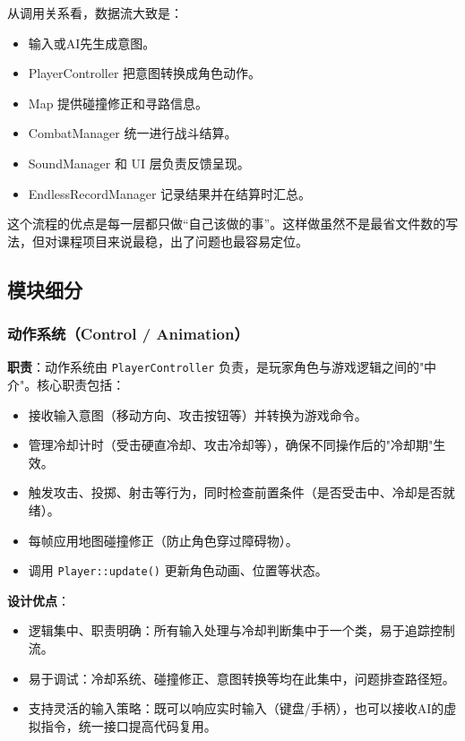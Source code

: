 ﻿\documentclass[utf8]{ctexart}
\begin{document}
从调用关系看，数据流大致是：

\begin{itemize}
  \item 输入或AI先生成意图。
  \item PlayerController 把意图转换成角色动作。
  \item Map 提供碰撞修正和寻路信息。
  \item CombatManager 统一进行战斗结算。
  \item SoundManager 和 UI 层负责反馈呈现。
  \item EndlessRecordManager 记录结果并在结算时汇总。
\end{itemize}

这个流程的优点是每一层都只做“自己该做的事”。这样做虽然不是最省文件数的写法，但对课程项目来说最稳，出了问题也最容易定位。

\subsection{模块细分}

\subsubsection{动作系统（Control / Animation）}

\textbf{职责}：动作系统由 \texttt{PlayerController} 负责，是玩家角色与游戏逻辑之间的"中介"。核心职责包括：

\begin{itemize}
  \item 接收输入意图（移动方向、攻击按钮等）并转换为游戏命令。
  \item 管理冷却计时（受击硬直冷却、攻击冷却等），确保不同操作后的"冷却期"生效。
  \item 触发攻击、投掷、射击等行为，同时检查前置条件（是否受击中、冷却是否就绪）。
  \item 每帧应用地图碰撞修正（防止角色穿过障碍物）。
  \item 调用 \texttt{Player::update()} 更新角色动画、位置等状态。
\end{itemize}

\textbf{设计优点}：

\begin{itemize}
  \item 逻辑集中、职责明确：所有输入处理与冷却判断集中于一个类，易于追踪控制流。
  \item 易于调试：冷却系统、碰撞修正、意图转换等均在此集中，问题排查路径短。
  \item 支持灵活的输入策略：既可以响应实时输入（键盘/手柄），也可以接收AI的虚拟指令，统一接口提高代码复用。
\end{itemize}
\end{document}
